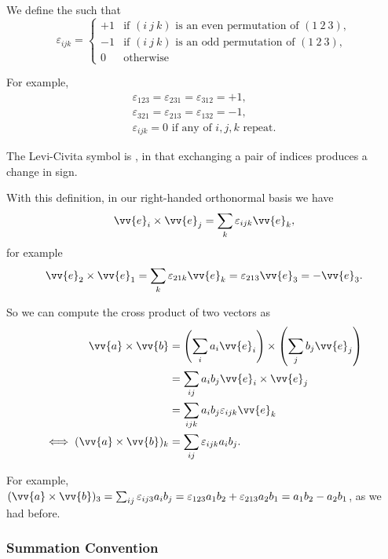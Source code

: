 \begin{definition}
    We define the  such that
    $$
    \varepsilon_{ijk} = \begin{cases}
        +1 &\mbox{if } (i\ j\ k) \text{ is an even permutation of } (1\ 2\ 3), \\
        -1 &\mbox{if } (i\ j\ k) \text{ is an odd permutation of } (1\ 2\ 3), \\ 
        0 &\mbox{otherwise}
       \end{cases}
    $$
\end{definition}

For example,
\begin{align*}
    \varepsilon_{123} =  \varepsilon_{231} =  \varepsilon_{312} = +1, \\
    \varepsilon_{321} =  \varepsilon_{213} =  \varepsilon_{132} = -1, \\
    \varepsilon_{ijk} = 0 \text{ if any of } i,j,k \text{ repeat.}
\end{align*}

The Levi-Civita symbol is , in that exchanging a pair of indices produces a change in sign.

With this definition, in our right-handed orthonormal basis we have
$$
\vv{e}_i \times \vv{e}_j = \sum_k \varepsilon_{ijk} \vv{e}_k,
$$
for example
$$
\vv{e}_2 \times \vv{e}_1 = \sum_k \varepsilon_{21k}\vv{e}_k = \varepsilon_{213} \vv{e}_3 = - \vv{e}_3.
$$

So we can compute the cross product of two vectors as
\begin{align*}
    \vv{a}\times \vv{b} &= \left(\sum_i a_i \vv{e}_i\right) \times \left(\sum_j b_j \vv{e}_j\right) \\
    &= \sum_{ij} a_i b_j \vv{e}_i \times \vv{e}_j \\
    &= \sum_{ijk} a_i b_j \varepsilon_{ijk} \vv{e}_k \\
\iff (\vv{a} \times \vv{b})_k &= \sum_{ij} \varepsilon_{ijk} a_i b_j.
\end{align*}

For example, $(\vv{a} \times \vv{b})_3 = \sum_{ij} \varepsilon_{ij3} a_i b_j = \varepsilon_{123} a_1 b_2 + \varepsilon_{213} a_2 b_1 = a_1 b_2 - a_2 b_1$, as we had before.

\subsubsection{Summation Convention}

